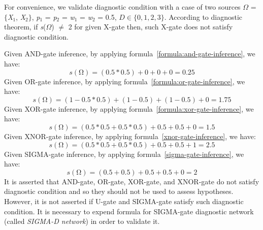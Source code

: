 \documentclass{article}
\numberwithin{equation}{section}
\numberwithin{figure}{section}
\numberwithin{table}{section}
\begin{document}
For convenience, we validate diagnostic condition with a case of two sources $\Omega$ = $\{$\textit{X}${}_{1}$, \textit{X}${}_{2}$$\}$, \textit{p}${}_{1}$ = \textit{p}${}_{2}$ = \textit{w}${}_{1}$ = \textit{w}${}_{2}$ = 0.5, $D\in \{0,1,2,3\}$. According to diagnostic theorem, if \textit{s}($\Omega$) $\mathrm{\neq}$ 2 for given X-gate then, such X-gate does not satisfy diagnostic condition.

Given AND-gate inference, by applying formula~\ref{formula:and-gate-inference}, we have:
\[s\left(\mathrm{\Omega }\right)=\left(0.5*0.5\right)+0+0+0=0.25\] 
Given OR-gate inference, by applying formula~\ref{formula:or-gate-inference}, we have:
\[s\left(\mathrm{\Omega }\right)=\left(1-0.5*0.5\right)+\left(1-0.5\right)+\left(1-0.5\right)+0=1.75\] 
Given XOR-gate inference, by applying formula~\ref{formula:xor-gate-inference}, we have:
\[s\left(\mathrm{\Omega }\right)=\left(0.5*0.5+0.5*0.5\right)+0.5+0.5+0=1.5\] 
Given XNOR-gate inference, by applying formula~\ref{xnor-gate-inference}, we have:
\[s\left(\mathrm{\Omega }\right)=\left(0.5*0.5+0.5*0.5\right)+0.5+0.5+1=2.5\] 
Given SIGMA-gate inference, by applying formula~\ref{sigma-gate-inference}, we have:
\[s\left(\mathrm{\Omega }\right)=\left(0.5+0.5\right)+0.5+0.5+0=2\] 
It is asserted that AND-gate, OR-gate, XOR-gate, and XNOR-gate do not satisfy diagnostic condition and so they should not be used to assess hypotheses. However, it is not asserted if U-gate and SIGMA-gate satisfy such diagnostic condition. It is necessary to expend formula for SIGMA-gate diagnostic network (called \textit{SIGMA-D network}) in order to validate it.
\end{document}
